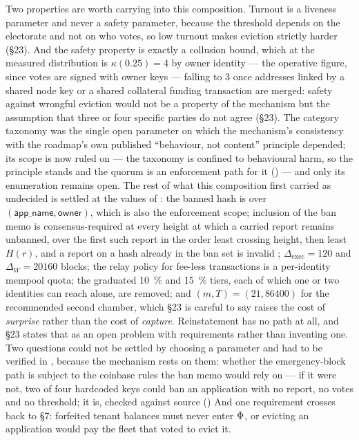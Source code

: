 Two properties are worth carrying into this composition. Turnout is a liveness parameter and never a
safety parameter, because the threshold depends on the electorate and not on who votes, so low
turnout makes eviction strictly harder (\S23). And the safety property is exactly a collusion bound,
which at the measured distribution is $\kappa(0.25) = 4$ by owner identity --- the operative figure,
since votes are signed with owner keys --- falling to $3$ once addresses linked by a shared node key
or a shared collateral funding transaction are merged: safety against wrongful eviction would not be
a property of the mechanism but the assumption that three or four specific parties do not agree
(\S23). The category taxonomy was the single open parameter on which the mechanism's consistency with
the roadmap's own published ``behaviour, not content'' principle depended; its scope is now ruled on
--- the taxonomy is confined to behavioural harm, so the principle stands and the quorum is an
enforcement path for it () --- and only its enumeration remains open. The rest of what this composition first carried as
undecided is settled at the values of : the banned hash is over
$(\mathsf{app\_name}, \mathsf{owner})$, which is also the enforcement scope; inclusion of the ban
memo is consensus-required at every height at which a carried report remains unbanned, over the
first such report in the order least crossing height, then least $H(r)$, and a report on a hash
already in the ban set is invalid ;
$\Delta_{\mathrm{exec}} = \num{120}$ and $\Delta_W = \num{20160}$ blocks;
the relay policy for fee-less transactions is a per-identity mempool quota; the graduated
\SI{10}{\percent} and \SI{15}{\percent} tiers, each of which one or two identities can reach alone,
are removed; and $(m, T) = (21, \num{86400})$ for the recommended second chamber, which \S23 is
careful to say raises the cost of \emph{surprise} rather than the cost of \emph{capture}.
Reinstatement has no path at all, and \S23 states that as an open problem with requirements rather
than inventing one. Two questions could not be settled by choosing a parameter and had to be
verified in \fluxd, because the mechanism rests on them: whether the emergency-block path is subject
to the coinbase rules the ban memo would rely on --- if it were not, two of four hardcoded keys could
ban an application with no report, no votes and no threshold; it is, checked against source
()  And one requirement crosses
back to \S7: forfeited tenant balances must never enter $\Phi$, or
evicting an application would pay the fleet that voted to evict it.

